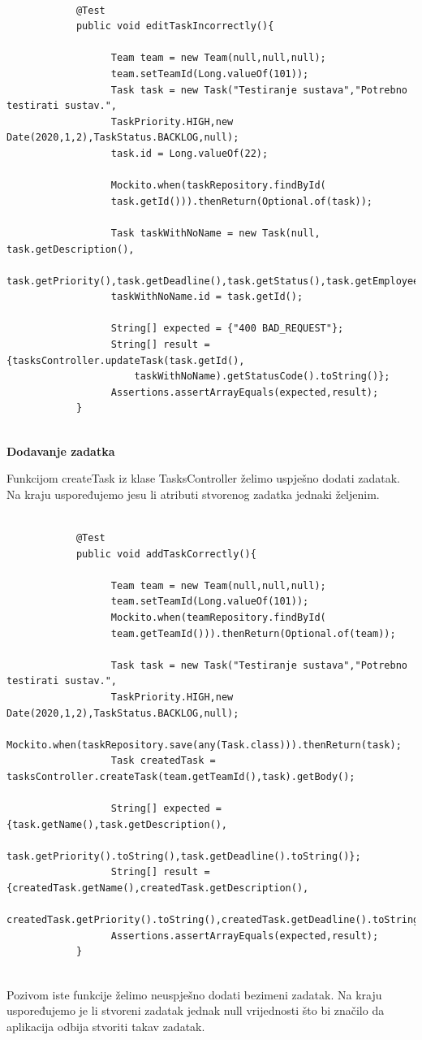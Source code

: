 		\begin{verbatim}
			
			@Test
			public void editTaskIncorrectly(){
				  
				  Team team = new Team(null,null,null);
				  team.setTeamId(Long.valueOf(101));
				  Task task = new Task("Testiranje sustava","Potrebno testirati sustav.",
				  TaskPriority.HIGH,new Date(2020,1,2),TaskStatus.BACKLOG,null);
				  task.id = Long.valueOf(22);
				
				  Mockito.when(taskRepository.findById(
				  task.getId())).thenReturn(Optional.of(task));
				
				  Task taskWithNoName = new Task(null, task.getDescription(),
				  task.getPriority(),task.getDeadline(),task.getStatus(),task.getEmployee());
				  taskWithNoName.id = task.getId();
				
				  String[] expected = {"400 BAD_REQUEST"};
				  String[] result = {tasksController.updateTask(task.getId(),
					  taskWithNoName).getStatusCode().toString()};
				  Assertions.assertArrayEquals(expected,result);
			}
			
		\end{verbatim}
		\textbf{Dodavanje zadatka}
		
		Funkcijom createTask iz klase TasksController želimo uspješno dodati zadatak. Na kraju uspoređujemo jesu li atributi stvorenog zadatka jednaki željenim.
		\begin{verbatim}
			
			@Test
			public void addTaskCorrectly(){
				  
				  Team team = new Team(null,null,null);
				  team.setTeamId(Long.valueOf(101));
				  Mockito.when(teamRepository.findById(
				  team.getTeamId())).thenReturn(Optional.of(team));
				
				  Task task = new Task("Testiranje sustava","Potrebno testirati sustav.",
				  TaskPriority.HIGH,new Date(2020,1,2),TaskStatus.BACKLOG,null);
				  Mockito.when(taskRepository.save(any(Task.class))).thenReturn(task);
				  Task createdTask = tasksController.createTask(team.getTeamId(),task).getBody();
				
				  String[] expected = {task.getName(),task.getDescription(),
					  task.getPriority().toString(),task.getDeadline().toString()};
				  String[] result = {createdTask.getName(),createdTask.getDescription(),
					  createdTask.getPriority().toString(),createdTask.getDeadline().toString()};
				  Assertions.assertArrayEquals(expected,result);
			}
			
		\end{verbatim}
		Pozivom iste funkcije želimo neuspješno dodati bezimeni zadatak. Na kraju uspoređujemo je li stvoreni zadatak jednak null vrijednosti što bi značilo da aplikacija odbija stvoriti takav zadatak.
		
